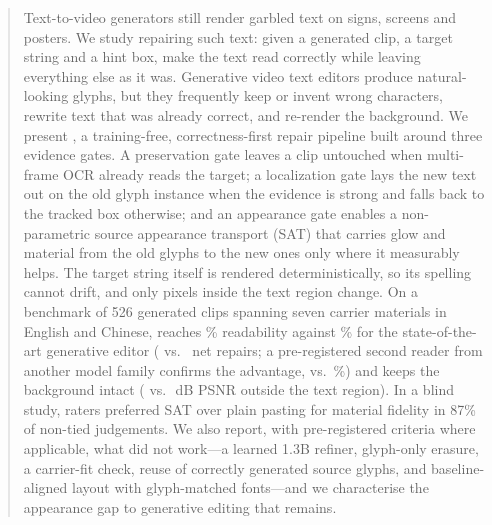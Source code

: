 \begin{abstract}
Text-to-video generators still render garbled text on signs, screens and posters. We study repairing such text: given a generated clip, a target string and a hint box, make the text read correctly while leaving everything else as it was. Generative video text editors produce natural-looking glyphs, but they frequently keep or invent wrong characters, rewrite text that was already correct, and re-render the background. We present \method, a training-free, correctness-first repair pipeline built around three evidence gates. A preservation gate leaves a clip untouched when multi-frame OCR already reads the target; a localization gate lays the new text out on the old glyph instance when the evidence is strong and falls back to the tracked box otherwise; and an appearance gate enables a non-parametric source appearance transport (SAT) that carries glow and material from the old glyphs to the new ones only where it measurably helps. The target string itself is rendered deterministically, so its spelling cannot drift, and only pixels inside the text region change. On a benchmark of 526 generated clips spanning seven carrier materials in English and Chinese, \method reaches \rOursRead\% readability against \rSteerRead\% for the state-of-the-art generative editor \steer (\rOursNet{} vs.\ \rSteerNet{} net repairs; a pre-registered second reader from another model family confirms the advantage, \jIvlOurs{} vs.\ \jIvlSteer\%) and keeps the background intact (\rOursBG{} vs.\ \rSteerBG\,dB PSNR outside the text region). In a blind study, raters preferred SAT over plain pasting for material fidelity in 87\% of non-tied judgements. We also report, with pre-registered criteria where applicable, what did not work---a learned 1.3B refiner, glyph-only erasure, a carrier-fit check, reuse of correctly generated source glyphs, and baseline-aligned layout with glyph-matched fonts---and we characterise the appearance gap to generative editing that remains.
\end{abstract}
